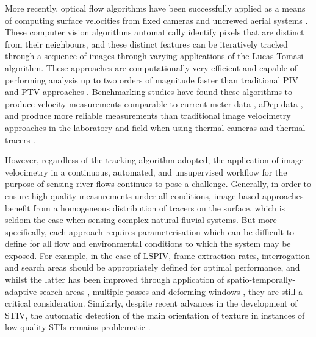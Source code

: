 \documentclass[hess, manuscript]{copernicus}
\begin{document}
More recently, optical flow algorithms have been successfully applied as a means of computing surface velocities from fixed cameras \citep{Tauro2018b, Lin2019, Khalid2019} and uncrewed aerial systems \citep{Perks2016}. These computer vision algorithms automatically identify pixels that are distinct from their neighbours, and these distinct features can be iteratively tracked through a sequence of images through varying applications of the Lucas-Tomasi algorithm. These approaches are computationally very efficient and capable of performing analysis up to two orders of magnitude faster than traditional PIV and PTV approaches \citep{Tauro2018b}. Benchmarking studies have found these algorithms to produce velocity measurements comparable to current meter data \citep{Tauro2018b}, aDcp data \citep{Pearce2020}, and produce more reliable measurements than traditional image velocimetry approaches in the laboratory and field when using thermal cameras and thermal tracers \citep{Lin2019}. 

However, regardless of the tracking algorithm adopted, the application of image velocimetry in a continuous, automated, and unsupervised workflow for the purpose of sensing river flows continues to pose a challenge. Generally, in order to ensure high quality measurements under all conditions, image-based approaches benefit from a homogeneous distribution of tracers on the surface, which is seldom the case when sensing complex natural fluvial systems. But more specifically, each approach requires parameterisation which can be difficult to define for all flow and environmental conditions to which the system may be exposed. For example, in the case of LSPIV, frame extraction rates, interrogation and search areas should be appropriately defined for optimal performance, and whilst the latter has been improved through application of spatio-temporally-adaptive search areas \citep{Fleit2019}, multiple passes and deforming windows \citep[e.g.,][]{Thielicke2021}, they are still a critical consideration. Similarly, despite recent advances in the development of STIV, the automatic detection of the main orientation of texture in instances of low-quality STIs remains problematic \citep{Wang2024}.
\end{document}
